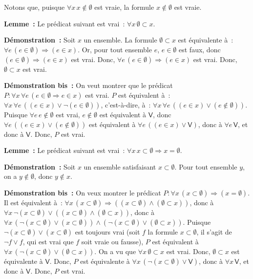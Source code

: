 Notons que, puisque $\forall x \, x \notin \emptyset$ est vraie, la formule $x \notin \emptyset$ est vraie.

\medskip

\noindent\textbf{Lemme :} Le prédicat suivant est vrai : $\forall x \, \emptyset \subset x$.

\medskip

\noindent\textbf{Démonstration :} Soit $x$ un ensemble. 
    La formule $\emptyset \subset x$ est équivalente à : $\forall e \, (e \in \emptyset) \Rightarrow (e \in x)$. 
    Or, pour tout ensemble $e$, $e \in \emptyset$ est faux, donc $(e \in \emptyset) \Rightarrow (e \in x)$ est vrai.
    Donc, $\forall e \, (e \in \emptyset) \Rightarrow (e \in x)$ est vrai. 
    Donc, $\emptyset \subset x$ est vrai.

\done

\medskip

\noindent\textbf{Démonstration bis :} 
    On veut montrer que le prédicat $P: \forall x \, \forall e \, (e \in \emptyset \Rightarrow e \in x)$ est vrai. 
    $P$ est équivalent à : $\forall x \, \forall e \, ((e \in x) \vee \neg (e \in \emptyset))$, c'est-à-dire, à : $\forall x \, \forall e \, ((e \in x) \vee (e \notin \emptyset))$.
    Puisque $\forall e \, e \notin \emptyset$ est vrai, $e \notin \emptyset$ est équivalent à $\mathsf{V}$, donc $\forall e \, ((e \in x) \vee (e \notin \emptyset))$ est équivalent à $\forall e \, ((e \in x) \vee \mathsf{V})$, donc à $\forall e \, \mathsf{V}$, et donc à $\mathsf{V}$.
    Donc, $P$ est vrai. 

    \done

\medskip

\noindent\textbf{Lemme :} Le prédicat suivant est vrai : $\forall x \, x \subset \emptyset \Rightarrow x = \emptyset$.

\medskip

\noindent\textbf{Démonstration :} Soit $x$ un ensemble satisfaisant $x \subset \emptyset$.
    Pour tout ensemble $y$, on a $y \notin \emptyset$, donc $y \notin x$.
    
\done

\medskip

\noindent\textbf{Démonstration bis :} 
    On veux montrer le prédicat $P: \forall x \, (x \subset \emptyset) \Rightarrow (x = \emptyset)$.
    Il est équivalent à : $\forall x \, (x \subset \emptyset) \Rightarrow ((x \subset \emptyset) \wedge (\emptyset \subset x))$, donc à $\forall x \, \neg (x \subset \emptyset) \vee ((x \subset \emptyset) \wedge (\emptyset \subset x))$, donc à $\forall x \, (\neg (x \subset \emptyset) \vee (x \subset \emptyset)) \wedge (\neg (x \subset \emptyset) \vee (\emptyset \subset x))$.
    Puisque $\neg (x \subset \emptyset) \vee (x \subset \emptyset)$ est toujours vrai (soit $f$ la formule $x \subset \emptyset$, il s'agit de $\neg f \vee f$, qui est vrai que $f$ soit vraie ou fausse), $P$ est équivalent à $\forall x \, (\neg (x \subset \emptyset) \vee (\emptyset \subset x))$.
    On a vu que $\forall x \, \emptyset \subset x$ est vrai.
    Donc, $\emptyset \subset x$ est équivalente à $\mathsf{V}$.
    Donc, $P$ est équivalente à $\forall x \, (\neg (x \subset \emptyset) \vee \mathsf{V})$, donc à $\forall x \, \mathsf{V}$, et donc à $\mathsf{V}$.
    Donc, $P$ est vrai.


